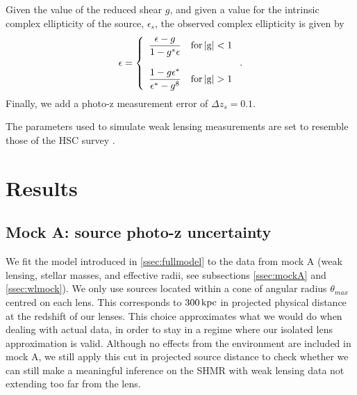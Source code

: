 \documentclass[usenatbib]{mnras}
\def\thetamax{\theta_{max}}
\begin{document}
Given the value of the reduced shear $g$, and given a value for the intrinsic complex ellipticity of the source, $\epsilon_s$,
the observed complex ellipticity is given by \citep{S+S97}
\begin{equation}
\epsilon = \left\{\begin{array}{ll} \dfrac{\epsilon - g}{1 - g^*\epsilon} & \rm{for}\,|g| < 1 \\
& \\
\dfrac{1 - g\epsilon^*}{\epsilon^* - g^8} & \rm{for}\,|g| > 1\end{array}\right. .
\end{equation}
Finally, we add a photo-z measurement error of $\Delta z_s = 0.1$.

The parameters used to simulate weak lensing measurements are set to resemble those of the HSC survey \citep{Man++17, Tan++17}.


\section{Results}\label{sect:results}

\subsection{Mock A: source photo-z uncertainty}

We fit the model introduced in \ref{ssec:fullmodel} to the data from mock A (weak lensing, stellar masses, and effective radii, see subsections \ref{ssec:mockA} and \ref{ssec:wlmock}). We only use sources located within a cone of angular radius $\thetamax$ centred on each lens. This corresponds to $300\,\rm{kpc}$ in projected physical distance at the redshift of our lenses.
This choice approximates what we would do when dealing with actual data, in order to stay in a regime where our isolated lens approximation is valid. 
Although no effects from the environment are included in mock A, we still apply this cut in projected source distance to check whether we can still make a meaningful inference on the SHMR with weak lensing data not extending too far from the lens.
\end{document}
